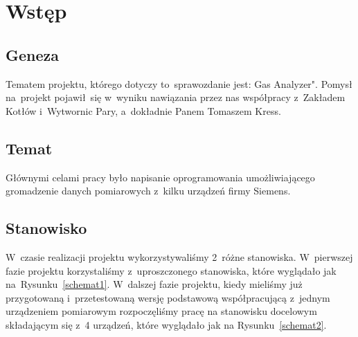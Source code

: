 \section{Wstęp}

\subsection{Geneza}
Tematem projektu, którego dotyczy to~sprawozdanie jest: Gas Analyzer". Pomysł na~projekt pojawił~się w~wyniku nawiązania przez nas współpracy z~Zakładem Kotłów i~Wytwornic Pary, a~dokładnie Panem Tomaszem Kress.

\subsection{Temat}
Głównymi celami pracy było napisanie oprogramowania umożliwiającego gromadzenie danych pomiarowych z~kilku urządzeń firmy Siemens.

\subsection{Stanowisko}
W~czasie realizacji projektu wykorzystywaliśmy 2~różne stanowiska. W~pierwszej fazie projektu korzystaliśmy z~uproszczonego stanowiska, które wyglądało jak na~Rysunku~\ref{schemat1}. W~dalszej fazie projektu, kiedy mieliśmy już przygotowaną i~przetestowaną wersję podstawową współpracującą z~jednym urządzeniem pomiarowym rozpoczęliśmy pracę na stanowisku docelowym składającym się z~4 urządzeń, które wyglądało jak na Rysunku~\ref{schemat2}.
